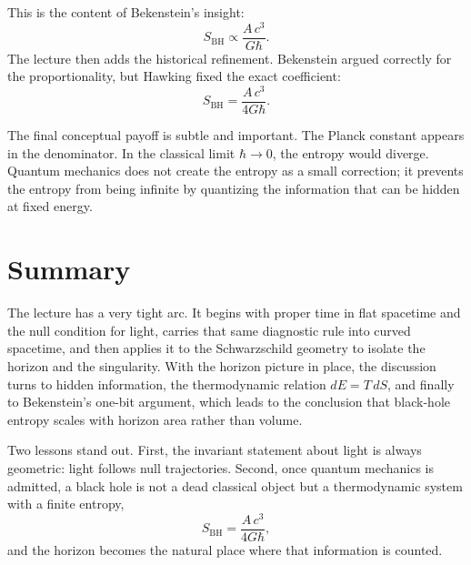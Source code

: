 This is the content of Bekenstein's insight:
\begin{equation}
S_{\mathrm{BH}} \propto \frac{A\,c^3}{G\hbar}.
\end{equation}
The lecture then adds the historical refinement. Bekenstein argued correctly for the proportionality, but Hawking fixed the exact coefficient:
\begin{equation}
S_{\mathrm{BH}}=\frac{A\,c^3}{4G\hbar}.
\end{equation}

The final conceptual payoff is subtle and important. The Planck constant appears in the denominator. In the classical limit \(\hbar\to 0\), the entropy would diverge. Quantum mechanics does not create the entropy as a small correction; it prevents the entropy from being infinite by quantizing the information that can be hidden at fixed energy.

\section{Summary}

The lecture has a very tight arc. It begins with proper time in flat spacetime and the null condition for light, carries that same diagnostic rule into curved spacetime, and then applies it to the Schwarzschild geometry to isolate the horizon and the singularity. With the horizon picture in place, the discussion turns to hidden information, the thermodynamic relation \(dE=T\,dS\), and finally to Bekenstein's one-bit argument, which leads to the conclusion that black-hole entropy scales with horizon area rather than volume.

Two lessons stand out. First, the invariant statement about light is always geometric: light follows null trajectories. Second, once quantum mechanics is admitted, a black hole is not a dead classical object but a thermodynamic system with a finite entropy,
\[
S_{\mathrm{BH}}=\frac{A\,c^3}{4G\hbar},
\]
and the horizon becomes the natural place where that information is counted.